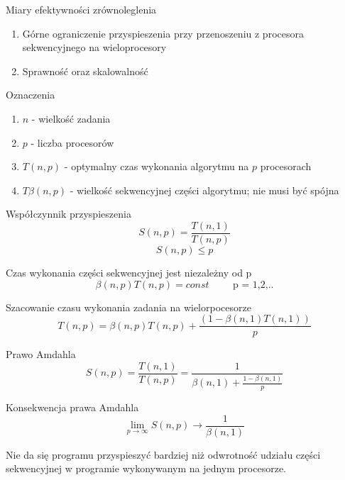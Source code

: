 \documentclass{beamer}
\begin{document}
\begin{frame}{Miary efektywności zrównoleglenia}
  \begin{enumerate}
  \item Górne ograniczenie przyspieszenia przy przenoszeniu z procesora sekwencyjnego na wieloprocesory
  \item Sprawność oraz skalowalność
  \end{enumerate}
\end{frame}

\begin{frame}{Oznaczenia}
  \begin{enumerate}
  \item $n$ - wielkość zadania
  \item $p$ - liczba procesorów
  \item $T(n,p)$ - optymalny czas wykonania algorytmu na $p$ procesorach
  \item $T\beta(n,p)$ - wielkość sekwencyjnej części algorytmu; nie musi być spójna
  \end{enumerate}
\end{frame}

\begin{frame}{Współczynnik przyspieszenia}
  $$ S(n,p) = \frac{T(n,1)}{T(n,p)} $$
  $$ S(n,p) \leq p$$
\end{frame}

\begin{frame}{Czas wykonania części sekwencyjnej jest niezależny od p}
  $$ \beta(n,p) T(n, p) = const \hspace{1cm}\mbox{p = 1,2,..} $$
\end{frame}

\begin{frame}{Szacowanie czasu wykonania zadania na wielorpocesorze}
  $$ T(n,p) = \beta(n,p) T(n,p) + \frac{(1-\beta(n,1) T(n,1))}{p} $$
\end{frame}


\begin{frame}{Prawo Amdahla}
  $$ S(n,p) = \frac{T(n,1)}{T(n,p)} = \frac{1}{\beta(n,1) + \frac{1 - \beta(n,1)}{p}} $$
\end{frame}

\begin{frame}{Konsekwencja prawa Amdahla}
  $$ \lim_{p \rightarrow \infty}S(n,p) \rightarrow \frac{1}{\beta(n,1)} $$

  Nie da się programu przyspieszyć bardziej niż odwrotność udziału części sekwencyjnej w programie wykonywanym na jednym procesorze.
\end{frame}
\end{document}
